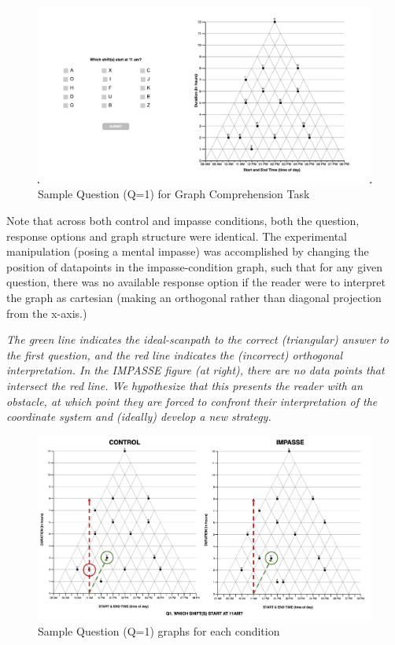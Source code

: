 \documentclass[
  letterpaper,
  DIV=11,
  numbers=noendperiod]{scrreprt}
\begin{document}
\begin{figure}

{\centering \includegraphics{analysis/SGC3A/static/stimuli/sample_task.png}

}

\caption{\label{fig-sample}Sample Question (Q=1) for Graph Comprehension
Task}

\end{figure}

Note that across both control and impasse conditions, both the question,
response options and graph structure were identical. The experimental
manipulation (posing a mental impasse) was accomplished by changing the
position of datapoints in the impasse-condition graph, such that for any
given question, there was no available response option if the reader
were to interpret the graph as cartesian (making an orthogonal rather
than diagonal projection from the x-axis.)

\emph{The green line indicates the ideal-scanpath to the correct
(triangular) answer to the first question, and the red line indicates
the (incorrect) orthogonal interpretation. In the IMPASSE figure (at
right), there are no data points that intersect the red line. We
hypothesize that this presents the reader with an obstacle, at which
point they are forced to confront their interpretation of the coordinate
system and (ideally) develop a new strategy.}

\begin{figure}

{\centering \includegraphics{analysis/SGC3A/static/stimuli/3A_conditions.png}

}

\caption{\label{fig-conditions}Sample Question (Q=1) graphs for each
condition}

\end{figure}
\end{document}
